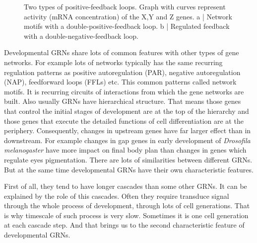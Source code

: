 \documentclass[a4paper, twoside]{report}
\begin{document}
\begin{figure}[h]
\caption{Two types of positive-feedback loops. Graph with curves represent activity (mRNA concentration) of the X,Y and Z genes. 
a | Network motifs with a double-positive-feedback loop.
b | Regulated feedback with a double-negative-feedback loop.}
\label{fig:fig_1}
\end{figure}

Developmental GRNs share lots of common features with other types of gene networks.
For example lots of networks typically has the same recurring regulation patterns as positive autoregulation (PAR), negative autoregulation (NAP), feedforward loops (FFLs) etc.
This common patterns called network motifs.
It is recurring circuits of interactions from which the gene networks are built.
Also usually GRNs have hierarchical structure.
That means those genes that control the initial stages of development are at the top of the hierarchy and those genes that execute the detailed functions of cell differentiation are at the periphery.
Consequently, changes in upstream genes have far larger effect than in downstream.
For example changes in gap genes in early development of \textit{Drosofila melanogaster} have more impact on final body plan than changes in genes which regulate eyes pigmentation.
There are lots of similarities between different GRNs.
But at the same time developmental GRNs have their own characteristic features.

First of all, they tend to have longer cascades than some other GRNs.
It can be explained by the role of this cascades.
Often they require transduce signal through the whole process of development, through lots of cell generations.
That is why timescale of such process is very slow.
Sometimes it is one cell generation at each cascade step.
And that brings us to the second characteristic feature of developmental GRNs.
\end{document}
